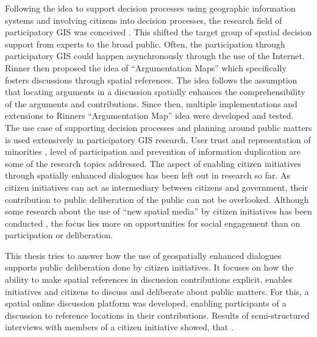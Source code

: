 Following the idea to support decision processes using geographic information systems and involving citizens into decision processes, the research field of participatory GIS was conceived \cite{Macintosh2004_eParticipation_characterization,Sieber2006_PublicParticipationGIS}. This shifted the target group of spatial decision support from experts to the broad public. Often, the participation through participatory GIS could happen asynchronously through the use of the Internet. Rinner then proposed the idea of ``Argumentation Maps'' \cite{Rinner_ArgumentationMaps} which specifically fosters discussions through spatial references. The idea follows the assumption that locating arguments in a discussion spatially enhances the comprehensibility of the arguments and contributions. Since then, multiple implementations and extensions to Rinners ``Argumentation Map'' idea were developed and tested.\\
The use case of supporting decision processes and planning around public matters is used extensively in participatory GIS research. User trust and representation of minorities \cite{Carver2001_PPGIS_Cyberdemocracy}, level of participation \cite{Steinmann2005_Combination_Ladder_GIS} and prevention of information duplication \cite{Hopfer2007_Communication} are some of the research topics addressed. The aspect of enabling citizen initiatives through spatially enhanced dialogues has been left out in research so far. As citizen initiatives can act as intermediary between citizens and government, their contribution to public deliberation of the public can not be overlooked. Although some research about the use of ``new spatial media'' by citizen initiatives has been conducted \cite{Elwood2013_NewSpatialMedia}, the focus lies more on opportunities for social engagement than on participation or deliberation.

This thesis tries to answer how the use of geospatially enhanced dialogues supports public deliberation done by citizen initiatives. It focuses on how the ability to make spatial references in discussion contributions explicit, enables initiatives and citizens to discuss and deliberate about public matters. For this, a spatial online discussion platform was developed, enabling participants of a discussion to reference locations in their contributions. Results of semi-structured interviews with members of a citizen initiative showed, that .


